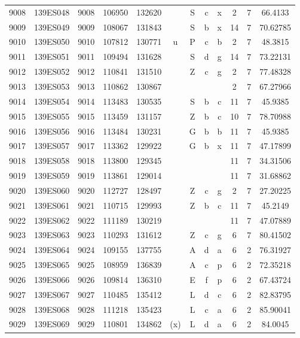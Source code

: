 \begin{tabular}{|*{12}{c|}}
9008 & 139ES048 & 9008 & 106950 & 132620 &  & S & c & x & 2 & 7 & 66.4133 \\ 
9009 & 139ES049 & 9009 & 108067 & 131843 &  & S & b & x & 14 & 7 & 70.62785 \\ 
9010 & 139ES050 & 9010 & 107812 & 130771 & u & P & c & b & 2 & 7 & 48.3815 \\ 
9011 & 139ES051 & 9011 & 109494 & 131628 &  & S & d & g & 14 & 7 & 73.22131 \\ 
9012 & 139ES052 & 9012 & 110841 & 131510 &  & Z & c & g & 2 & 7 & 77.48328 \\ 
9013 & 139ES053 & 9013 & 110862 & 130867 &  &  &  &  & 2 & 7 & 67.27966 \\ 
9014 & 139ES054 & 9014 & 113483 & 130535 &  & S & b & c & 11 & 7 & 45.9385 \\ 
9015 & 139ES055 & 9015 & 113459 & 131157 &  & Z & b & c & 10 & 7 & 78.70988 \\ 
9016 & 139ES056 & 9016 & 113484 & 130231 &  & G & b & b & 11 & 7 & 45.9385 \\ 
9017 & 139ES057 & 9017 & 113362 & 129922 &  & G & b & x & 11 & 7 & 47.17899 \\ 
9018 & 139ES058 & 9018 & 113800 & 129345 &  &  &  &  & 11 & 7 & 34.31506 \\ 
9019 & 139ES059 & 9019 & 113861 & 129014 &  &  &  &  & 11 & 7 & 31.68862 \\ 
9020 & 139ES060 & 9020 & 112727 & 128497 &  & Z & c & g & 2 & 7 & 27.20225 \\ 
9021 & 139ES061 & 9021 & 110715 & 129993 &  & Z & b & c & 11 & 7 & 45.2149 \\ 
9022 & 139ES062 & 9022 & 111189 & 130219 &  &  &  &  & 11 & 7 & 47.07889 \\ 
9023 & 139ES063 & 9023 & 110293 & 131612 &  & Z & c & g & 6 & 7 & 80.41502 \\ 
9024 & 139ES064 & 9024 & 109155 & 137755 &  & A & d & a & 6 & 2 & 76.31927 \\ 
9025 & 139ES065 & 9025 & 108959 & 136839 &  & A & c & p & 6 & 2 & 72.35218 \\ 
9026 & 139ES066 & 9026 & 109814 & 136310 &  & E & f & p & 6 & 2 & 67.43724 \\ 
9027 & 139ES067 & 9027 & 110485 & 135412 &  & L & d & c & 6 & 2 & 82.83795 \\ 
9028 & 139ES068 & 9028 & 111218 & 135423 &  & L & c & a & 6 & 2 & 85.90041 \\ 
9029 & 139ES069 & 9029 & 110801 & 134862 & (x) & L & d & a & 6 & 2 & 84.0045 \\ 

\end{tabular}
